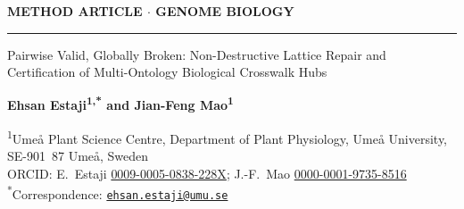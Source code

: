 \documentclass[10pt]{article}
\theoremstyle{accentdef}
\begin{document}
\thispagestyle{firstpage}

{\setlength{\parindent}{0pt}%
{\footnotesize\bfseries\color{accent}\lsstyle METHOD ARTICLE $\cdot$ GENOME BIOLOGY}\par\vspace{2pt}
{\color{accent}\rule{\textwidth}{1.0pt}}\par\vspace{8pt}
{\LARGE\bfseries\color{ink}\raggedright Pairwise Valid, Globally Broken: Non-Destructive Lattice Repair and Certification of Multi-Ontology Biological Crosswalk Hubs\par}
\vspace{8pt}
{\normalsize\bfseries\color{ink}Ehsan Estaji\textsuperscript{1,*} \quad and \quad Jian-Feng Mao\textsuperscript{1}\par}
\vspace{4pt}
{\small\color{muted}%
\textsuperscript{1}Ume{\aa} Plant Science Centre, Department of Plant Physiology, Ume{\aa} University, SE-901~87 Ume{\aa}, Sweden\\[1.5pt]
ORCID: E.~Estaji \href{https://orcid.org/0009-0005-0838-228X}{0009-0005-0838-228X}; J.-F.~Mao \href{https://orcid.org/0000-0001-9735-8516}{0000-0001-9735-8516}\\[1.5pt]
\textsuperscript{*}Correspondence: \href{mailto:ehsan.estaji@umu.se}{\texttt{ehsan.estaji@umu.se}}\par}
\vspace{4pt}%
}
\end{document}
